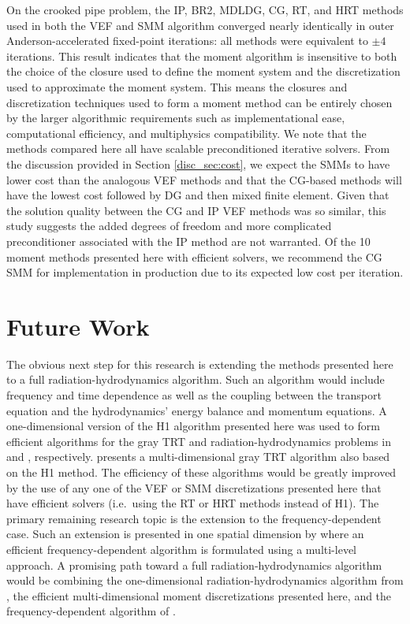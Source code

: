 \documentclass[../doc.tex]{subfiles}
\begin{document}
On the crooked pipe problem, the IP, BR2, MDLDG, CG, RT, and HRT methods used in both the VEF and SMM algorithm converged nearly identically in outer Anderson-accelerated fixed-point iterations: all methods were equivalent to $\pm 4$ iterations. This result indicates that the moment algorithm is insensitive to both the choice of the closure used to define the moment system and the discretization used to approximate the moment system. This means the closures and discretization techniques used to form a moment method can be entirely chosen by the larger algorithmic requirements such as implementational ease, computational efficiency, and multiphysics compatibility. We note that the methods compared here all have scalable preconditioned iterative solvers. From the discussion provided in Section \ref{disc_sec:cost}, we expect the SMMs to have lower cost than the analogous VEF methods and that the CG-based methods will have the lowest cost followed by DG and then mixed finite element. Given that the solution quality between the CG and IP VEF methods was so similar, this study suggests the added degrees of freedom and more complicated preconditioner associated with the IP method are not warranted. Of the 10 moment methods presented here with efficient solvers, we recommend the CG SMM for implementation in production due to its expected low cost per iteration. 

\section{Future Work}
The obvious next step for this research is extending the methods presented here to a full radiation-hydrodynamics algorithm. Such an algorithm would include frequency and time dependence as well as the coupling between the transport equation and the hydrodynamics' energy balance and momentum equations. 
A one-dimensional version of the H1 algorithm presented here was used to form efficient algorithms for the gray TRT and radiation-hydrodynamics problems in \textcite{LOU2019258} and \textcite{LOU2021110393}, respectively. \textcite{yee_mc21} presents a multi-dimensional gray TRT algorithm also based on the H1 method. The efficiency of these algorithms would be greatly improved by the use of any one of the VEF or SMM discretizations presented here that have efficient solvers (i.e.~using the RT or HRT methods instead of H1). 
The primary remaining research topic is the extension to the frequency-dependent case. Such an extension is presented in one spatial dimension by \textcite{anistratov2020nonlinear,ANISTRATOV2019186} where an efficient frequency-dependent algorithm is formulated using a multi-level approach. A promising path toward a full radiation-hydrodynamics algorithm would be combining the one-dimensional radiation-hydrodynamics algorithm from \textcite{LOU2021110393}, the efficient multi-dimensional moment discretizations presented here, and the frequency-dependent algorithm of \textcite{anistratov2020nonlinear,ANISTRATOV2019186}. 
\end{document}
